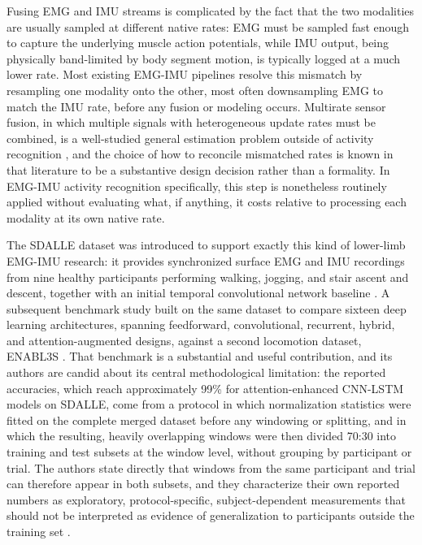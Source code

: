\documentclass[conference]{IEEEtran}
\begin{document}
Fusing EMG and IMU streams is complicated by the fact that the two
modalities are usually sampled at different native rates: EMG must
be sampled fast enough to capture the underlying muscle action
potentials, while IMU output, being physically band-limited by body
segment motion, is typically logged at a much lower rate. Most
existing EMG-IMU pipelines resolve this mismatch by resampling one
modality onto the other, most often downsampling EMG to match the
IMU rate, before any fusion or modeling occurs. Multirate sensor
fusion, in which multiple signals with heterogeneous update rates
must be combined, is a well-studied general estimation problem
outside of activity recognition \cite{shen2022multiratefusion}, and
the choice of how to reconcile mismatched rates is known in that
literature to be a substantive design decision rather than a
formality. In EMG-IMU activity recognition specifically, this
step is nonetheless routinely applied without evaluating what, if
anything, it costs relative to processing each modality at its own
native rate.

The SDALLE dataset was introduced to support exactly this kind of
lower-limb EMG-IMU research: it provides synchronized surface EMG
and IMU recordings from nine healthy participants performing
walking, jogging, and stair ascent and descent, together with an
initial temporal convolutional network baseline
\cite{el-khoreby2025sdalle}. A subsequent benchmark study built on
the same dataset to compare sixteen deep learning architectures,
spanning feedforward, convolutional, recurrent, hybrid, and
attention-augmented designs, against a second locomotion dataset,
ENABL3S \cite{farouk2026sdalle}. That benchmark is a substantial and
useful contribution, and its authors are candid about its central
methodological limitation: the reported accuracies, which reach
approximately 99\% for attention-enhanced CNN-LSTM models on SDALLE,
come from a protocol in which normalization statistics were fitted
on the complete merged dataset before any windowing or splitting,
and in which the resulting, heavily overlapping windows were then
divided 70:30 into training and test subsets at the window level,
without grouping by participant or trial. The authors state directly
that windows from the same participant and trial can therefore
appear in both subsets, and they characterize their own reported
numbers as exploratory, protocol-specific, subject-dependent
measurements that should not be interpreted as evidence of
generalization to participants outside the training set
\cite{farouk2026sdalle}.
\end{document}
